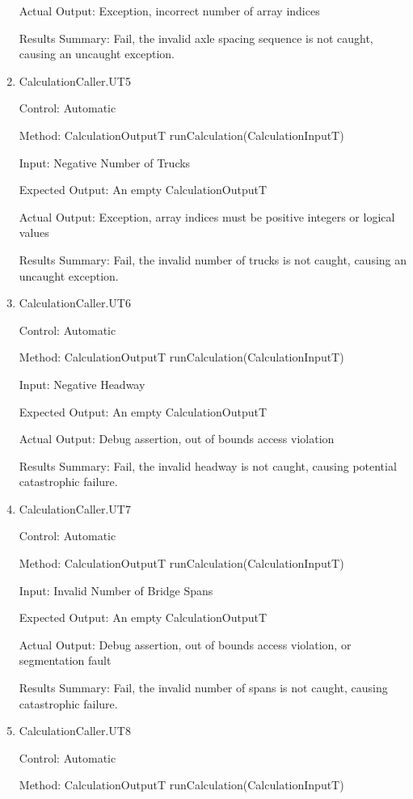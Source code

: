 \documentclass[12pt, titlepage]{article}
\begin{document}
\begin{enumerate}
  Actual Output: Exception, incorrect number of array indices

  Results Summary: Fail, the invalid axle spacing sequence is not caught, causing an uncaught exception.
  
  \item {CalculationCaller.UT5}

  Control: Automatic

  Method: CalculationOutputT runCalculation(CalculationInputT)

  Input: Negative Number of Trucks

  Expected Output: An empty CalculationOutputT

  Actual Output: Exception, array indices must be positive integers or logical values

  Results Summary: Fail, the invalid number of trucks is not caught, causing an uncaught exception.

  \item {CalculationCaller.UT6}

  Control: Automatic

  Method: CalculationOutputT runCalculation(CalculationInputT)

  Input: Negative Headway

  Expected Output: An empty CalculationOutputT

  Actual Output: Debug assertion, out of bounds access violation

  Results Summary: Fail, the invalid headway is not caught, causing potential catastrophic failure.

  \item {CalculationCaller.UT7}

  Control: Automatic

  Method: CalculationOutputT runCalculation(CalculationInputT)

  Input: Invalid Number of Bridge Spans

  Expected Output: An empty CalculationOutputT

  Actual Output: Debug assertion, out of bounds access violation, or segmentation fault

  Results Summary: Fail, the invalid number of spans is not caught, causing catastrophic failure.

  \item {CalculationCaller.UT8}

  Control: Automatic

  Method: CalculationOutputT runCalculation(CalculationInputT)


\end{enumerate}
\end{document}
